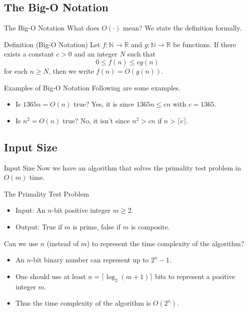 \documentclass{beamer}
\begin{document}
\subsection{The Big-O Notation}
\begin{frame}{The Big-O Notation}
  What does $O(\cdot)$ mean?
  We state the definition formally. \pause
  \begin{block}{Definition (Big-O Notation)}
    Let $f: \mathbb{N} \to \mathbb{R}$ and $g: \mathbb{N} \to \mathbb{R}$ be
    functions.
    If there exists a constant $c > 0$ and an integer $N$ such that
    \begin{equation*}
      0 \leq f(n) \leq cg(n)
    \end{equation*}
    for each $n \geq N$, then we write $f(n) = O(g(n))$.
  \end{block}
\end{frame}

\begin{frame}{Examples of Big-O Notation}
  Following are some examples. \pause
  \begin{itemize}
    \item Is $1365n = O(n)$ true? \pause
    Yes, it is since $1365n \leq cn$ with $c = 1365$. \pause
    \item Is $n^2 = O(n)$ true? \pause
    No, it isn't since $n^2 > cn$ if $n > \lceil c \rceil$.
  \end{itemize}
\end{frame}

\subsection{Input Size}
\begin{frame}{Input Size}
  Now we have an algorithm that solves the primality test problem in $O(m)$
  time.
  \begin{block}{The Primality Test Problem}
    \begin{itemize}
      \item Input: An $n$-bit positive integer $m \geq 2$.
      \item Output: True if $m$ is prime, false if $m$ is composite. \pause
    \end{itemize}
  \end{block}
  Can we use $n$ (instead of $m$) to represent the time complexity of the
  algorithm? \pause
  \begin{itemize}
    \item An $n$-bit binary number can represent up to $2^n - 1$. \pause
    \item One should use at least $n = \lceil\log_2 (m + 1)\rceil$ bits
    to represent a positive integer $m$. \pause
    \item Thus the time complexity of the algorithm is $O(2^n)$.
  \end{itemize}
\end{frame}
\end{document}
